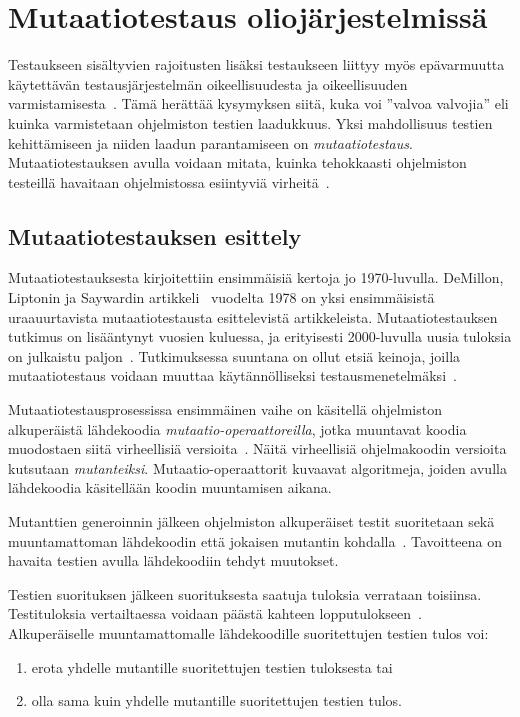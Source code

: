 \documentclass[finnish, grading]{tktltiki2}
\theoremstyle{definition}
\theoremstyle{remark}
\begin{document}
\section{Mutaatiotestaus oliojärjestelmissä}

Testaukseen sisältyvien rajoitusten lisäksi testaukseen liittyy myös epävarmuutta käytettävän testausjärjestelmän oikeellisuudesta ja oikeellisuuden varmistamisesta~\cite[s. 209]{Manna:Waldinger:1978}. Tämä herättää kysymyksen siitä, kuka voi ''valvoa valvojia'' eli kuinka varmistetaan ohjelmiston testien laadukkuus. Yksi mahdollisuus testien kehittämiseen ja niiden laadun parantamiseen on \textit{mutaatiotestaus}. Mutaatiotestauksen avulla voidaan mitata, kuinka tehokkaasti ohjelmiston testeillä havaitaan ohjelmistossa esiintyviä virheitä~\cite[s. 649]{Jia:Harman:2011}.

\subsection{Mutaatiotestauksen esittely}

Mutaatiotestauksesta kirjoitettiin ensimmäisiä kertoja jo 1970-luvulla. DeMillon, Liptonin ja Saywardin artikkeli~\cite{DeMillo:Lipton:Sayward:1978} vuodelta 1978 on yksi ensimmäisistä uraauurtavista mutaatiotestausta esittelevistä artikkeleista. Mutaatiotestauksen tutkimus on lisääntynyt vuosien kuluessa, ja erityisesti 2000-luvulla uusia tuloksia on julkaistu paljon~\cite[s. 1102]{Offutt:2011}. Tutkimuksessa suuntana on ollut etsiä keinoja, joilla mutaatiotestaus voidaan muuttaa käytännölliseksi testausmenetelmäksi~\cite[s. 649]{Jia:Harman:2011}. 

Mutaatiotestausprosessissa ensimmäinen vaihe on käsitellä ohjelmiston alkuperäistä lähdekoodia \textit{mutaatio-operaattoreilla}, jotka muuntavat koodia muodostaen siitä virheellisiä versioita~\cite[s. 869]{Ma:Harrold:Kwon:2006}. Näitä virheellisiä ohjelmakoodin versioita kutsutaan \textit{mutanteiksi}. Mutaatio-operaattorit kuvaavat algoritmeja, joiden avulla lähdekoodia käsitellään koodin muuntamisen aikana.

Mutanttien generoinnin jälkeen ohjelmiston alkuperäiset testit suoritetaan sekä muuntamattoman lähdekoodin että jokaisen mutantin kohdalla~\cite[s. 652]{Jia:Harman:2011}. Tavoitteena on havaita testien avulla lähdekoodiin tehdyt muutokset. 

Testien suorituksen jälkeen suorituksesta saatuja tuloksia verrataan toisiinsa. Testituloksia vertailtaessa voidaan päästä kahteen lopputulokseen~\cite[s. 36]{DeMillo:Lipton:Sayward:1978}. Alkuperäiselle muuntamattomalle lähdekoodille suoritettujen testien tulos voi: 
\begin{enumerate}
  \item erota yhdelle mutantille suoritettujen testien tuloksesta tai
  \item olla sama kuin yhdelle mutantille suoritettujen testien tulos.
\end{enumerate}
\end{document}
